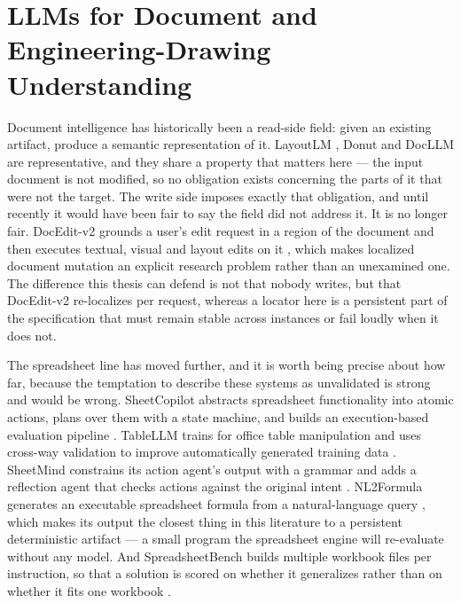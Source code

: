 \section{LLMs for Document and Engineering-Drawing Understanding}
\label{sec:rel:understanding}

Document intelligence has historically been a read-side field: given an existing artifact,
produce a semantic representation of it. LayoutLM \cite{xu2020layoutlm}, Donut
\cite{kim2022donut} and DocLLM \cite{wang2024docllm} are representative, and they share a
property that matters here --- the input document is not modified, so no obligation exists
concerning the parts of it that were not the target. The write side imposes exactly that
obligation, and until recently it would have been fair to say the field did not address it.
It is no longer fair. DocEdit-v2 grounds a user's edit request in a region of the document and
then executes textual, visual and layout edits on it \cite{suri2024doceditv2}, which makes
localized document mutation an explicit research problem rather than an unexamined one. The
difference this thesis can defend is not that nobody writes, but that DocEdit-v2 re-localizes
per request, whereas a locator here is a persistent part of the specification that must remain
stable across instances or fail loudly when it does not.

The spreadsheet line has moved further, and it is worth being precise about how far, because
the temptation to describe these systems as unvalidated is strong and would be wrong.
SheetCopilot abstracts spreadsheet functionality into atomic actions, plans over them with a
state machine, and builds an execution-based evaluation pipeline \cite{li2023sheetcopilot}.
TableLLM trains for office table manipulation and uses cross-way validation to improve
automatically generated training data \cite{zhang2025tablellm}. SheetMind constrains its action
agent's output with a grammar and adds a reflection agent that checks actions against the
original intent \cite{cheng2025sheetmind}. NL2Formula generates an executable spreadsheet
formula from a natural-language query \cite{zhao2024nl2formula}, which makes its output the
closest thing in this literature to a persistent deterministic artifact --- a small program the
spreadsheet engine will re-evaluate without any model. And SpreadsheetBench builds multiple
workbook files per instruction, so that a solution is scored on whether it generalizes rather
than on whether it fits one workbook \cite{ma2024spreadsheetbench}.


